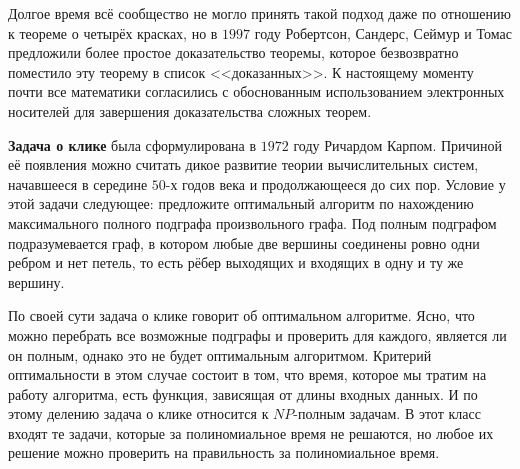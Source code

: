 	Долгое время всё сообщество не могло принять такой подход даже по отношению к теореме о четырёх красках, но в $1997$ 
	году Робертсон, Сандерс, Сеймур и Томас предложили более простое доказательство теоремы, которое безвозвратно поместило эту 
	теорему в список <<доказанных>>. К настоящему моменту почти все математики согласились с обоснованным использованием 
	электронных носителей для завершения доказательства сложных теорем.
	
	\textbf{Задача о клике} была сформулирована в $1972$ году Ричардом Карпом. Причиной её появления можно считать дикое развитие 
	теории вычислительных систем, начавшееся в середине $50$-х годов  века и продолжающееся до сих пор. Условие у этой задачи 
	следующее: предложите оптимальный алгоритм по нахождению максимального полного подграфа произвольного графа. Под полным подграфом 
	подразумевается граф, в котором любые две вершины соединены ровно одни ребром и нет петель, то есть рёбер выходящих и 
	входящих в одну и ту же вершину.
	
	По своей сути задача о клике говорит об оптимальном алгоритме. Ясно, что можно перебрать все возможные подграфы 
	и проверить для каждого, является ли он полным, однако это не будет оптимальным алгоритмом. Критерий оптимальности 
	в этом случае состоит в том, что время, которое мы тратим на работу алгоритма, есть функция, зависящая от длины входных 
	данных. И по этому делению задача о клике относится к $NP$-полным задачам. В этот класс входят те задачи, которые за 
	полиномиальное время не решаются, но любое их решение можно проверить на правильность за полиномиальное время.
	
